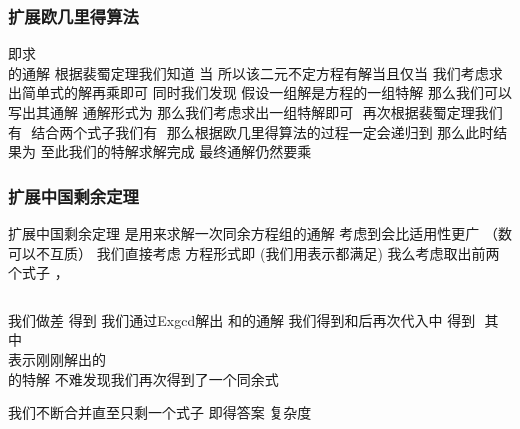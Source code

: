 \documentclass[8pt,a4paper]{article}
\newcommand{\code}[1]{
    
}
\newcommand{\txt}[1]{\par\noindent\footnotesize #1}
\newcommand{\inlineformula}[1]{\ensuremath{}}
\newcommand{\displayformula}[1]{%
    \vspace{0.2em}
    \[
        
    \]
}
\begin{document}
\begin{multicols}{2}
        \subsubsection{扩展欧几里得算法}
            \txt{即求 \displayformula{./assets/formulas_tex/formula_045.tex}的通解  根据裴蜀定理我们知道 当\inlineformula{./assets/formulas_tex/formula_046.tex}
所以该二元不定方程有解当且仅当\inlineformula{./assets/formulas_tex/formula_047.tex} 我们考虑求出简单式的解再乘\inlineformula{./assets/formulas_tex/formula_048.tex}即可
同时我们发现 假设一组解\inlineformula{./assets/formulas_tex/formula_049.tex}是方程\inlineformula{./assets/formulas_tex/formula_050.tex}的一组特解
那么我们可以写出其通解  通解形式为\inlineformula{./assets/formulas_tex/formula_051.tex}
那么我们考虑求出一组特解即可
\inlineformula{./assets/formulas_tex/formula_052.tex}
再次根据裴蜀定理我们有
\inlineformula{./assets/formulas_tex/formula_053.tex}
结合两个式子我们有 \inlineformula{./assets/formulas_tex/formula_054.tex}  那么根据欧几里得算法的过程一定会递归到\inlineformula{./assets/formulas_tex/formula_055.tex}
那么此时结果为\inlineformula{./assets/formulas_tex/formula_056.tex} 至此我们的特解求解完成 最终通解仍然要乘\inlineformula{./assets/formulas_tex/formula_057.tex}}
            \code{src/number_theory/数论定理_7_5.cpp}
        \subsubsection{扩展中国剩余定理}
            \txt{扩展中国剩余定理 是用来求解一次同余方程组的通解 考虑到\inlineformula{./assets/formulas_tex/formula_058.tex}会比\inlineformula{./assets/formulas_tex/formula_059.tex}适用性更广
（\inlineformula{./assets/formulas_tex/formula_060.tex}数可以不互质） 我们直接考虑\inlineformula{./assets/formulas_tex/formula_061.tex}
方程形式即 \inlineformula{./assets/formulas_tex/formula_062.tex}(我们用\inlineformula{./assets/formulas_tex/formula_063.tex}表示都满足)
我么考虑取出前两个式子 \inlineformula{./assets/formulas_tex/formula_064.tex}，\displayformula{./assets/formulas_tex/formula_065.tex}
\displayformula{./assets/formulas_tex/formula_066.tex}
我们做差 得到\inlineformula{./assets/formulas_tex/formula_067.tex} 我们通过Exgcd解出 \inlineformula{./assets/formulas_tex/formula_068.tex}和\inlineformula{./assets/formulas_tex/formula_069.tex}的通解
我们得到\inlineformula{./assets/formulas_tex/formula_070.tex}和\inlineformula{./assets/formulas_tex/formula_071.tex}后再次代入\inlineformula{./assets/formulas_tex/formula_072.tex}中 得到
\inlineformula{./assets/formulas_tex/formula_073.tex}
其中\displayformula{./assets/formulas_tex/formula_074.tex}表示刚刚解出的\displayformula{./assets/formulas_tex/formula_075.tex}的特解
不难发现我们再次得到了一个同余式\displayformula{./assets/formulas_tex/formula_076.tex}
我们不断合并直至只剩一个式子 即得答案 复杂度\displayformula{./assets/formulas_tex/formula_077.tex}}
            \code{src/number_theory/数论定理_8_5.cpp}

\end{multicols}
\end{document}
